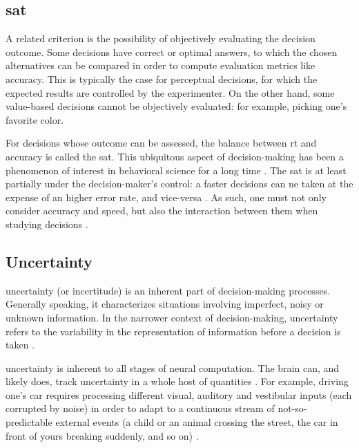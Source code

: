 \subsection{\acrlong{sat}}

A related criterion is the possibility of objectively evaluating the decision outcome. Some decisions have correct or optimal answers, to which the chosen alternatives can be compared in order to compute evaluation metrics like \gls{accuracy}. This is typically the case for perceptual decisions, for which the expected results are controlled by the experimenter. On the other hand, some value-based decisions cannot be objectively evaluated: for example, picking one's favorite color.

For decisions whose outcome can be assessed, the balance between \acrshort{rt} and accuracy is called the \acrfull{sat}. This ubiquitous aspect of decision-making has been a phenomenon of interest in behavioral science for a long time \cite{heitzSpeedaccuracyTradeoffHistory2014}. The \acrshort{sat} is at least partially under the decision-maker's control: a faster decisions can ne taken at the expense of an higher error rate, and vice-versa \cite{ratcliffDiffusionDecisionModel2016}. As such, one must not only consider accuracy and speed, but also the interaction between them when studying decisions \cite{myersPracticalIntroductionUsing2022}.

\subsection{Uncertainty}

\Gls{uncertainty} (or incertitude) is an inherent part of decision-making processes. Generally speaking, it characterizes situations involving imperfect, noisy or unknown information. In the narrower context of decision-making, \gls{uncertainty} refers to the variability in the representation of information before a decision is taken \cite{mamassianConfidenceForcedChoiceOther2020}.

\Gls{uncertainty} is inherent to all stages of neural computation. The brain can, and likely does, track uncertainty in a whole host of quantities \cite{flemingMetacognitionConfidenceReview}. For example, driving one's car requires processing different visual, auditory and vestibular inputs (each corrupted by noise) in order to adapt to a continuous stream of not-so-predictable external events (a child or an animal crossing the street, the car in front of yours breaking suddenly, and so on) \cite{pougetConfidenceCertaintyDistinct2016}.


